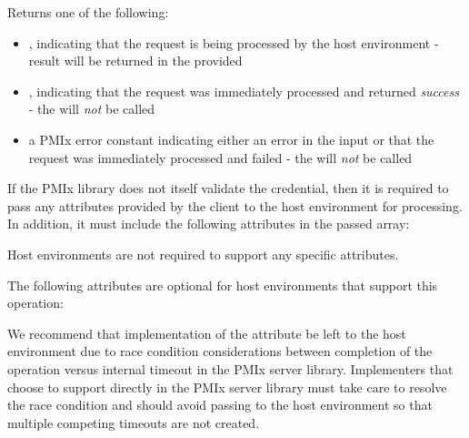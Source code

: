 \begin{arglist}
\end{arglist}

Returns one of the following:

\begin{itemize}
    \item {}, indicating that the request is being processed by the host environment - result will be returned in the provided 
    \item {}, indicating that the request was immediately processed and returned \textit{success} - the  will \textit{not} be called
    \item a PMIx error constant indicating either an error in the input or that the request was immediately processed and failed - the  will \textit{not} be called
\end{itemize}

\reqattrstart
If the \ac{PMIx} library does not itself validate the credential, then it is required to pass any attributes provided by the client to the host environment for processing. In addition, it must include the following attributes in the passed  array:


Host environments are not required to support any specific attributes.

\reqattrend

\optattrstart
The following attributes are optional for host environments that support this operation:


\optattrend

\adviceimplstart
We recommend that implementation of the  attribute be left to the host environment due to race condition considerations between completion of the operation versus internal timeout in the \ac{PMIx} server library. Implementers that choose to support  directly in the \ac{PMIx} server library must take care to resolve the race condition and should avoid passing  to the host environment so that multiple competing timeouts are not created.
\adviceimplend



